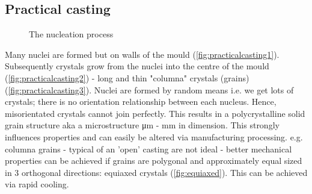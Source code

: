 \documentclass[class=report, crop=false, 12pt,a4paper]{standalone}
\begin{document}
\subsection{Practical casting}
\begin{figure}
  \centering
  \hfill
  \hfill
  \caption{The nucleation process}
  \label{fig:nucleationprocess}
\end{figure}
Many nuclei are formed but on walls of the mould (\ref{fig:practicalcasting1}). Subsequently crystals grow from the nuclei into the centre of the mould (\ref{fig:practicalcasting2}) - long and thin "columna" crystals (grains) (\ref{fig:practicalcasting3}). Nuclei are formed by random means i.e. we get lots of crystals; there is no orientation relationship between each nucleus. Hence, misorientated crystals cannot join perfectly. This results in a polycrystalline solid grain structure aka a microstructure \si{\micro\meter} - \si{\milli\meter} in dimension. This strongly influences properties and can easily be altered via manufacturing processing. e.g. columna grains - typical of an 'open' casting are not ideal - better mechanical properties can be achieved if grains are polygonal and approximately equal sized in 3 orthogonal directions: equiaxed crystals (\ref{fig:equiaxed}). This can be achieved via rapid cooling.
\end{document}
